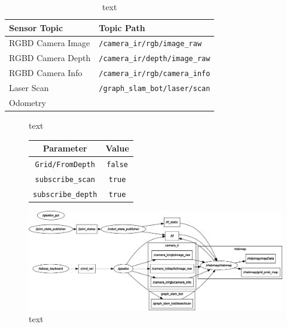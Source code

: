 \documentclass[a4paper]{article}
\begin{document}
\begin{table}[h]
	\centering
	\caption{text}
	\begin{tabular}{ll}
		\toprule
		\textbf{Sensor Topic} & \textbf{Topic Path} \\
		\midrule
		RGBD Camera Image & \texttt{/camera\_ir/rgb/image\_raw} \\
		RGBD Camera Depth & \texttt{/camera\_ir/depth/image\_raw} \\
		RGBD Camera Info & \texttt{/camera\_ir/rgb/camera\_info} \\
		Laser Scan & \texttt{/graph\_slam\_bot/laser/scan} \\
		Odometry & \texttt{} \\ 
		\bottomrule
	\end{tabular}
\end{table}

\begin{figure}[h]
	\begin{minipage}{0.45\textwidth}
		text
	\end{minipage}
	\hspace{0.5cm}
	\begin{minipage}{0.45\textwidth}
		\centering
		\begin{tabular}{cc}
			\toprule
			\textbf{Parameter} & \textbf{Value}\\
			\midrule
			\texttt{Grid/FromDepth} & \texttt{false} \\
			\texttt{subscribe\_scan} & \texttt{true} \\
			\texttt{subscribe\_depth} & \texttt{true} \\
			\bottomrule
		\end{tabular}
	\end{minipage}
\end{figure}

\clearpage

\begin{figure}
	\centering
	\includegraphics[scale=0.4]{rosgraph}
	\caption{text}
\end{figure}
\end{document}
